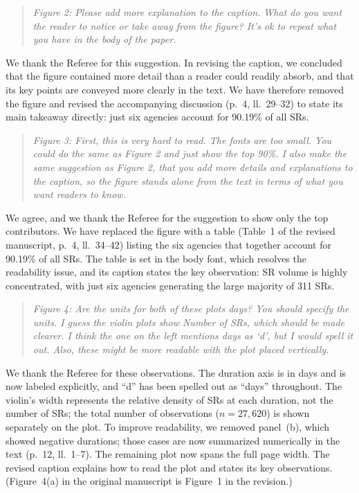 \documentclass[12pt]{article}
\newenvironment{comment}
{\begin{quotation}\noindent\small\itshape\color{darkblue}\ignorespaces}
{\end{quotation}}
\begin{document}
\FloatBarrier
\begin{comment}
Figure 2: Please add more explanation to the caption. What
do you want the reader to notice or take away from the figure? It's ok
to repeat what you have in the body of the paper.
\end{comment}

We thank the Referee for this suggestion. In revising the caption, we
concluded that the figure contained more detail than a reader could
readily absorb, and that its key points are conveyed more clearly in
the text. We have therefore removed the figure and revised the
accompanying discussion (p.~4, ll.~29--32) to state its main takeaway
directly: just six agencies account for 90.19\% of all SRs.

\FloatBarrier
\begin{comment}
Figure 3: First, this is very hard to read. The fonts are
too small. You could do the same as Figure 2 and just show the top
90\%. I also make the same suggestion as Figure 2, that you add more
details and explanations to the caption, so the figure stands alone
from the text in terms of what you want readers to know.
\end{comment}

We agree, and we thank the Referee for the suggestion to show only the
top contributors. We have replaced the figure with a table (Table~1 of
the revised manuscript, p.~4, ll.~34--42) listing the six agencies that together
account for 90.19\% of all SRs. The table is set in the body
font, which resolves the readability issue, and its caption states the
key observation: SR volume is highly concentrated, with just six
agencies generating the large majority of 311 SRs.

\FloatBarrier
\begin{comment}
Figure 4: Are the units for both of these plots days? You
should specify the units. I guess the violin plots show Number of SRs,
which should be made clearer. I think the one on the left mentions days
as `d', but I would spell it out. Also, these might be more readable
with the plot placed vertically.
\end{comment}

We thank the Referee for these observations. The duration axis is in
days and is now labeled explicitly, and ``d'' has been spelled out as
``days'' throughout. The violin's width represents the relative density of SRs at each duration, not the
number of SRs; the total number of observations ($n = 27{,}620$) is shown
separately on the plot. To improve readability, we removed panel~(b), which showed
negative durations; those cases are now summarized numerically in the
text (p.~12, ll.~1--7). The remaining plot now spans the full page
width. The revised caption explains how to read the plot and states its
key observations. (Figure~4(a) in the original manuscript is Figure~1
in the revision.)
\end{document}
